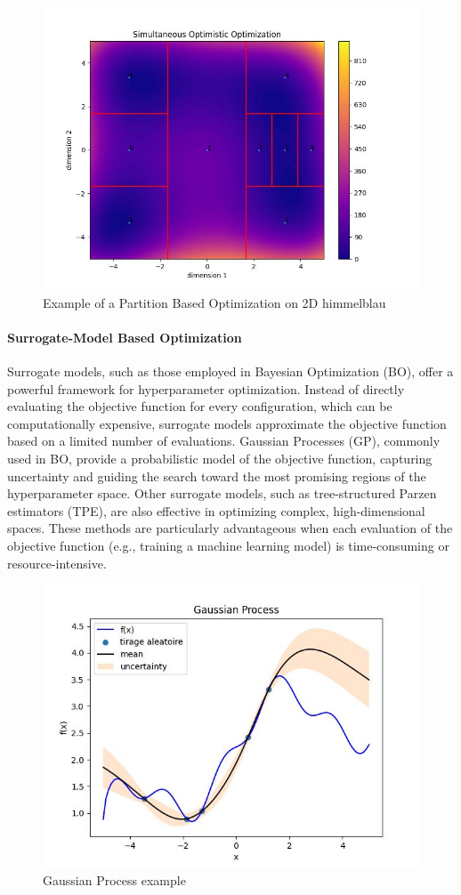 \begin{figure}
    \centering
    \includegraphics[width=0.5\linewidth]{assets/img/chap_2/plots/soo.jpg}
    \caption{Example of a Partition Based Optimization on 2D himmelblau}
    \label{fig:soo_ex}
\end{figure}

\FloatBarrier
\paragraph{Surrogate-Model Based Optimization}  
Surrogate models, such as those employed in Bayesian Optimization (BO), offer a powerful framework for hyperparameter optimization. Instead of directly evaluating the objective function for every configuration, which can be computationally expensive, surrogate models approximate the objective function based on a limited number of evaluations. Gaussian Processes (GP), commonly used in BO, provide a probabilistic model of the objective function, capturing uncertainty and guiding the search toward the most promising regions of the hyperparameter space. Other surrogate models, such as tree-structured Parzen estimators (TPE), are also effective in optimizing complex, high-dimensional spaces. These methods are particularly advantageous when each evaluation of the objective function (e.g., training a machine learning model) is time-consuming or resource-intensive.
\begin{figure}
    \centering
    \includegraphics[width=0.5\linewidth]{assets/img/chap_2/plots/gaussian_process.jpg}
    \caption{Gaussian Process example}
    \label{fig:gp_eg}
\end{figure}




